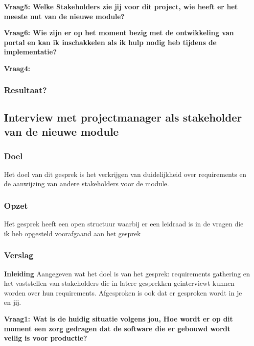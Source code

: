 \lipsum[05]
\bigskip

\textbf{Vraag5: Welke Stakeholders zie jij voor dit project, wie heeft er het meeste nut van de nieuwe module? }

\lipsum[06]
\bigskip

\textbf{Vraag6: Wie zijn er op het moment bezig met de ontwikkeling van portal en kan ik inschakkelen als ik hulp nodig heb tijdens de implementatie?}

\lipsum[09]
\bigskip

\textbf{Vraag4: }

\lipsum[07]

\subsubsection{Resultaat?}

\subsection{Interview met projectmanager als stakeholder van de nieuwe module}

\subsubsection{Doel}
Het doel van dit gesprek is het verkrijgen van duidelijkheid over requirements en de aanwijzing van andere stakeholders voor de module.

\subsubsection{Opzet}
Het gesprek heeft een open structuur waarbij er een leidraad is in de vragen die ik heb opgesteld voorafgaand aan het gesprek

\subsubsection{Verslag}
\textbf{Inleiding}
Aangegeven wat het doel is van het gesprek: requirements gathering en het vaststellen van stakeholders die in latere gesprekken geinterviewt kunnen worden over hun requirements. Afgesproken is ook dat er gesproken wordt in je en jij.

\bigskip

\textbf{Vraag1: Wat is de huidig situatie volgens jou, Hoe wordt er op dit moment een zorg gedragen dat de software die er gebouwd wordt veilig is voor productie?}

\lipsum[01]
\bigskip

